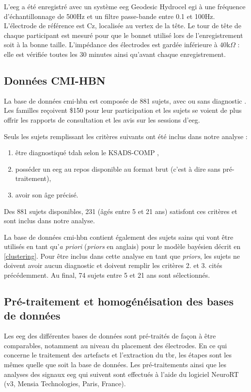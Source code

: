 L'\gls{eeg} a été enregistré avec un système \gls{eeg} Geodesic Hydrocel \gls{egi} à une fréquence d'échantillonnage de 500Hz et un filtre passe-bande entre 0.1 et 100Hz. 
L'électrode de référence est Cz, localisée au vertex de la tête. Le tour de tête de chaque participant est mesuré pour que le bonnet utilisé lors de l'enregistrement 
soit à la bonne taille. L'impédance des électrodes est gardée inférieure à $40\text{k}\Omega$ : elle est vérifiée toutes les 30 minutes ainsi qu'avant chaque enregistrement.

\subsection{Données CMI-HBN}
La base de données \gls{cmi-hbn} est composée de 881 sujets, avec ou sans diagnostic \citep{Alexander2017, Alexander2017b}. Les familles reçoivent \$150 pour leur participation 
et les sujets se voient de plus offrir les rapports de consultation et les avis sur les sessions d'\gls{eeg}.

Seuls les sujets remplissant les critères suivants ont été inclus dans notre analyse :
\begin{enumerate}
\item être diagnostiqué \gls{tdah} selon le KSADS-COMP \citep{Kaufman1997},
\item posséder un \gls{eeg} au repos disponible au format brut (c'est à dire sans pré-traitement),
\item avoir son âge précisé.
\end{enumerate}

Des 881 sujets disponibles, 231 (âgés entre 5 et 21 ans) satisfont ces critères et sont inclus dans notre analyse.

La base de données \gls{cmi-hbn} contient également des sujets sains qui vont être utilisés en tant qu'\textit{a priori} (\textit{priors} en anglais) pour le
modèle bayésien décrit en \ref{clustering}. Pour être inclus dans cette analyse en tant que \textit{priors}, les sujets ne doivent avoir aucun diagnostic 
et doivent remplir les critères 2. et 3. cités précédemment. Au final, 74 sujets entre 5 et 21 ans sont sélectionnés. 

\subsection{Pré-traitement et homogénéisation des bases de données} \label{pré-traitement TBR}
Les \gls{eeg} des différentes bases de données sont pré-traités de façon à être comparables, notamment au niveau du placement des électrodes.
En ce qui concerne le traitement des artefacts et l'extraction du \gls{tbr}, les étapes sont les mêmes quelle que soit la base de données. 
Les pré-traitements ainsi que les analyses des signaux \gls{eeg} qui suivent sont effectués à l'aide du logiciel NeuroRT (v3, Mensia Technologies, 
Paris, France).

